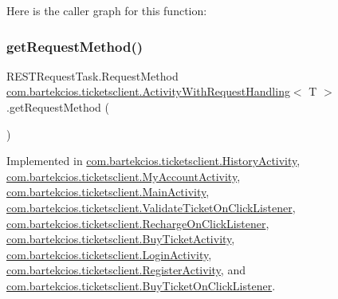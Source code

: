 Here is the caller graph for this function\+:
\mbox{\label{interfacecom_1_1bartekcios_1_1ticketsclient_1_1_activity_with_request_handling_a2de28f325f2c3d3b71101b30227331fb}} 
\subsubsection{\texorpdfstring{get\+Request\+Method()}{getRequestMethod()}}
{\footnotesize\ttfamily R\+E\+S\+T\+Request\+Task.\+Request\+Method \hyperlink{interfacecom_1_1bartekcios_1_1ticketsclient_1_1_activity_with_request_handling}{com.\+bartekcios.\+ticketsclient.\+Activity\+With\+Request\+Handling}$<$ T $>$.get\+Request\+Method (\begin{DoxyParamCaption}{ }\end{DoxyParamCaption})}



Implemented in \hyperlink{classcom_1_1bartekcios_1_1ticketsclient_1_1_history_activity_a471ac9b48e59349cae711971d15ae8ad}{com.\+bartekcios.\+ticketsclient.\+History\+Activity}, \hyperlink{classcom_1_1bartekcios_1_1ticketsclient_1_1_my_account_activity_a8f8f3ebb8ef30b89ea89838f25421a6f}{com.\+bartekcios.\+ticketsclient.\+My\+Account\+Activity}, \hyperlink{classcom_1_1bartekcios_1_1ticketsclient_1_1_main_activity_a63250038c650451726ffffa6ae2d2680}{com.\+bartekcios.\+ticketsclient.\+Main\+Activity}, \hyperlink{classcom_1_1bartekcios_1_1ticketsclient_1_1_validate_ticket_on_click_listener_a67d2d6a7e9b8cb270fb68947bc11cc2f}{com.\+bartekcios.\+ticketsclient.\+Validate\+Ticket\+On\+Click\+Listener}, \hyperlink{classcom_1_1bartekcios_1_1ticketsclient_1_1_recharge_on_click_listener_ab1f9eaac36fb11b24dbe126b5d3b4606}{com.\+bartekcios.\+ticketsclient.\+Recharge\+On\+Click\+Listener}, \hyperlink{classcom_1_1bartekcios_1_1ticketsclient_1_1_buy_ticket_activity_af45059ee41a02275e858584b518a8942}{com.\+bartekcios.\+ticketsclient.\+Buy\+Ticket\+Activity}, \hyperlink{classcom_1_1bartekcios_1_1ticketsclient_1_1_login_activity_ad31cbc5bfa2545d0795451f6243b8d56}{com.\+bartekcios.\+ticketsclient.\+Login\+Activity}, \hyperlink{classcom_1_1bartekcios_1_1ticketsclient_1_1_register_activity_a6b8d2934c8ccad249d89addd9b73a3b4}{com.\+bartekcios.\+ticketsclient.\+Register\+Activity}, and \hyperlink{classcom_1_1bartekcios_1_1ticketsclient_1_1_buy_ticket_on_click_listener_ad5c606967a8c4a31e1c6cbfd0244b551}{com.\+bartekcios.\+ticketsclient.\+Buy\+Ticket\+On\+Click\+Listener}.

